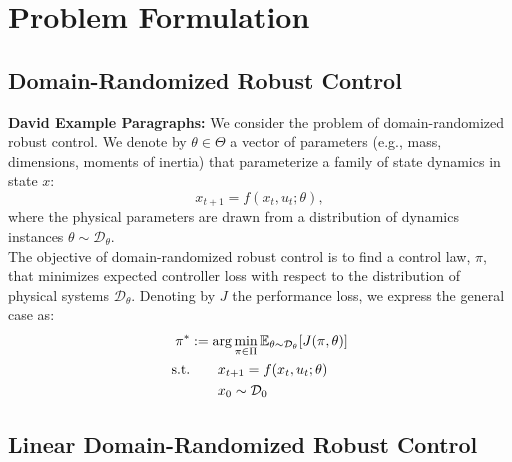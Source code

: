 \section{Problem Formulation}
\label{sec:problem_formulation}

\subsection{Domain-Randomized Robust Control}
\label{subsec:general_case}
\textbf{David Example Paragraphs:} We consider the problem of domain-randomized robust control. We denote by $\theta \in \Theta$ a vector of parameters (e.g., mass, dimensions, moments of inertia) that parameterize a family of state dynamics in state $x$: 
\begin{equation}
    x_{t+1} = f(x_t, u_t; \theta),
\end{equation}
where the physical parameters are drawn from a distribution of dynamics instances $\theta \sim \mathcal{D}_\theta$. \\

The objective of domain-randomized robust control is to find a control law, $\pi$, that minimizes expected controller loss with respect to the distribution of physical systems $\mathcal{D}_\theta$. Denoting by $J$ the performance loss, we express the general case as: 
\begin{equation}
    \begin{split}
        \pi^* & := \arg\min_{\pi \in \Pi} \mathbb{E}_{\theta \sim \mathcal{D}_\theta}[J(\pi, \theta)] \\
        \text{s.t.} & \hspace{7mm} x_{t+1} = f(x_t, u_t; \theta)\\ 
        & \hspace{7mm} x_0 \sim \mathcal{D}_{0}
    \end{split}
\end{equation}

\subsection{Linear Domain-Randomized Robust Control}
\label{subsec:linear_case}
\providecommand{\foundationsourcenote}[1]{{\normalfont\small\color{gray}%
  \hypersetup{citecolor=gray,linkcolor=gray,urlcolor=gray}%
  [Temporary source note: #1]}}

